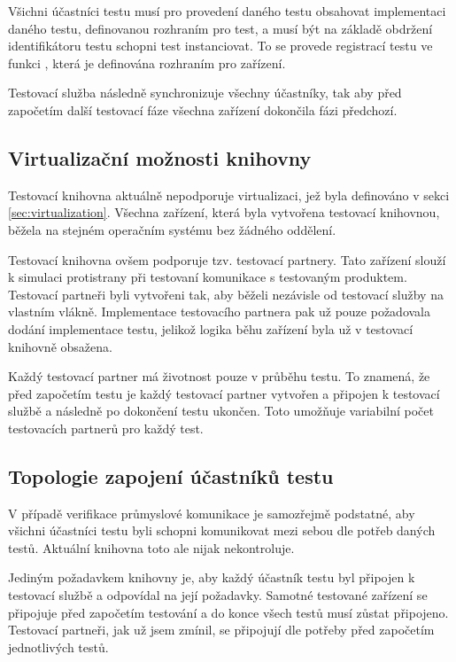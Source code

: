 Všichni účastníci testu musí pro provedení daného testu obsahovat implementaci daného testu, definovanou rozhraním pro test, a musí být na základě obdržení identifikátoru testu schopni test instanciovat. To se provede registrací testu ve funkci , která je definována rozhraním pro zařízení.

Testovací služba následně synchronizuje všechny účastníky, tak aby před započetím další testovací fáze všechna zařízení dokončila fázi předchozí. 

\subsection{Virtualizační možnosti knihovny}

Testovací knihovna aktuálně nepodporuje virtualizaci, jež byla definováno v sekci \ref{sec:virtualization}. Všechna zařízení, která byla vytvořena testovací knihovnou, běžela na stejném operačním systému bez žádného oddělení.

Testovací knihovna ovšem podporuje tzv. testovací partnery. Tato zařízení slouží k simulaci protistrany při testovaní komunikace s testovaným produktem. Testovací partneři byli vytvořeni tak, aby běželi nezávisle od testovací služby na vlastním vlákně. Implementace testovacího partnera pak už pouze požadovala dodání implementace testu, jelikož logika běhu zařízení byla už v testovací knihovně obsažena.

Každý testovací partner má životnost pouze v průběhu testu. To znamená, že před započetím testu je každý testovací partner vytvořen a připojen k testovací službě a následně po dokončení testu ukončen. Toto umožňuje variabilní počet testovacích partnerů pro každý test.

\subsection{Topologie zapojení účastníků testu}

V případě verifikace průmyslové komunikace je samozřejmě podstatné, aby všichni účastníci testu byli schopni komunikovat mezi sebou dle potřeb daných testů. Aktuální knihovna toto ale nijak nekontroluje. 

Jediným požadavkem knihovny je, aby každý účastník testu byl připojen k testovací službě a odpovídal na její požadavky. Samotné testované zařízení se připojuje před započetím testování a do konce všech testů musí zůstat připojeno. Testovací partneři, jak už jsem zmínil, se připojují dle potřeby před započetím jednotlivých testů.

